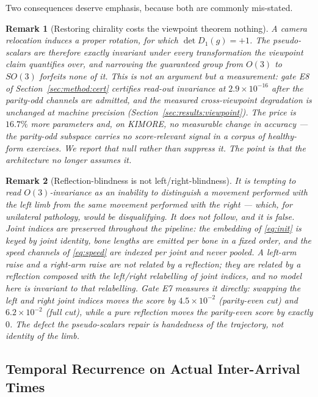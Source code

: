 \documentclass[10pt,journal]{IEEEtran}
\newtheorem{remark}{Remark}
\begin{document}
Two consequences deserve emphasis, because both are commonly mis-stated.

\begin{remark}[Restoring chirality costs the viewpoint theorem nothing]
\label{rem:parity}
A camera relocation induces a \emph{proper} rotation, for which $\det D_1(g)=+1$. The pseudo-scalars
are therefore exactly invariant under every transformation the viewpoint claim quantifies over, and
narrowing the guaranteed group from $O(3)$ to $SO(3)$ forfeits none of it. This is not an argument but
a measurement: gate E8 of Section~\ref{sec:method:cert} certifies read-out invariance at
$2.9\times10^{-16}$ \emph{after} the parity-odd channels are admitted, and the measured cross-viewpoint
degradation is unchanged at machine precision (Section~\ref{sec:results:viewpoint}). The price is
$16.7\%$ more parameters and, on KIMORE, no measurable change in accuracy --- the parity-odd subspace
carries no score-relevant signal in a corpus of healthy-form exercises. We report that null rather than
suppress it. The point is that the architecture no longer \emph{assumes} it.
\end{remark}

\begin{remark}[Reflection-blindness is not left/right-blindness]
\label{rem:laterality}
It is tempting to read $O(3)$-invariance as an inability to distinguish a movement performed with the
left limb from the same movement performed with the right --- which, for unilateral pathology, would be
disqualifying. It does not follow, and it is false. Joint \emph{indices} are preserved throughout the
pipeline: the embedding of \eqref{eq:init} is keyed by joint identity, bone lengths are emitted per
bone in a fixed order, and the speed channels of \eqref{eq:speed} are indexed per joint and never
pooled. A left-arm raise and a right-arm raise are not related by a reflection; they are related by a
reflection \emph{composed with} the left/right relabelling of joint indices, and no model here is
invariant to that relabelling. Gate E7 measures it directly: swapping the left and right joint indices
moves the score by $4.5\times10^{-2}$ (parity-even cut) and $6.2\times10^{-2}$ (full cut), while a pure
reflection moves the parity-even score by exactly $0$. The defect the pseudo-scalars repair is
handedness of the \emph{trajectory}, not identity of the \emph{limb}.
\end{remark}

\subsection{Temporal Recurrence on Actual Inter-Arrival Times}
\label{sec:method:recurrence}
\end{document}
